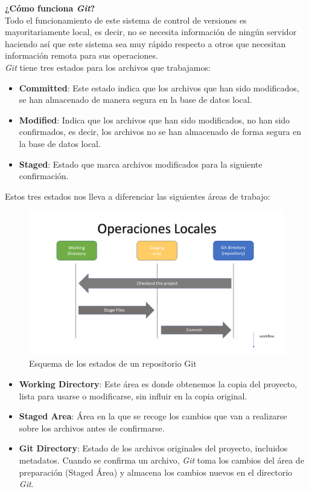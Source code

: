 \documentclass[a4paper, 12pt]{book}
\begin{document}
\textbf{¿Cómo funciona \emph{Git}?}\\
Todo el funcionamiento de este sistema de control de versiones es mayoritariamente local, es decir, no se necesita información de ningún servidor haciendo así que este sistema sea muy rápido respecto a otros que necesitan información remota para sus operaciones. \\
\emph{Git} tiene tres estados para los archivos que trabajamos:
\begin{itemize}
    \item \textbf{Committed}: Este estado indica que los archivos que han sido modificados, se han almacenado de manera segura en la base de datos local.
    \item \textbf{Modified}: Indica que los archivos que han sido modificados, no han sido confirmados, es decir, los archivos no se han almacenado de forma segura en la base de datos local.
    \item \textbf{Staged}: Estado que marca archivos modificados para la siguiente confirmación. 
\end{itemize}
Estos tres estados nos lleva a diferenciar las siguientes áreas de trabajo: 
\begin{figure}[ht]
    \centering
    \includegraphics[width=\textwidth]{img/git_states.png}
    \caption{ Esquema de los estados de un repositorio Git}
    \label{fig:gitStates}
\end{figure}
\begin{itemize}
    \item \textbf{Working Directory}: Este área es donde obtenemos la copia del proyecto, lista para usarse o modificarse, sin influir en la copia original.
    \item \textbf{Staged Area}: Área en la que se recoge los cambios que van a realizarse sobre los archivos antes de confirmarse.
    \item \textbf{Git Directory}: Estado de los archivos originales del proyecto, incluidos metadatos. Cuando se confirma un archivo, \emph{Git} toma los cambios del área de preparación (Staged Área) y almacena los cambios nuevos en el directorio \emph{Git}.
\end{itemize}
\end{document}
